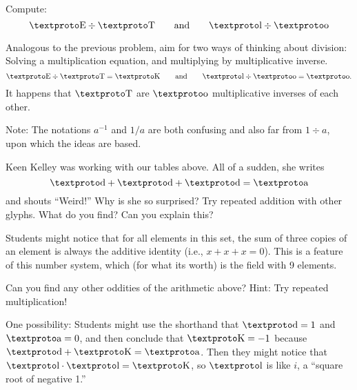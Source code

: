 \begin{prob} Compute:
\[
\lf \div \lc \qquad\text{and}\qquad \lh \div \li
\]
\begin{teachingnote}
Analogous to the previous problem, aim for two ways of thinking about division:  Solving a multiplication equation, and multiplying by multiplicative inverse. 
\[
\lf \div \lc = \ld \qquad\text{and}\qquad \lh \div \li = \li. \\
\]
It happens that $\lc$ are $\li$ multiplicative inverses of each other.  

Note:  The notations $a^{-1}$ and $1/a$ are both confusing and also far from $1\div a$, upon which the ideas are based.  
\end{teachingnote}
\end{prob}

\begin{prob} 
Keen Kelley was working with our tables above. All of a sudden, she
writes
\[
\loo + \loo + \loo = \lo
\]
and shouts ``Weird!'' Why is she so surprised? Try repeated addition
with other glyphs. What do you find? Can you explain this?
\begin{teachingnote}
Students might notice that for all elements in this set, the sum of three copies of an element is always the additive identity (i.e., $x + x + x = 0$).  This is a feature of this number system, which (for what its worth) is the field with 9 elements.  
\end{teachingnote}
\end{prob}


\begin{prob}
Can you find any other oddities of the arithmetic above? Hint: Try
repeated multiplication!
\begin{teachingnote}
One possibility: Students might use the shorthand that $\loo = 1$ and $\lo = 0$, and then conclude that $\ld = -1$ because $\loo+\ld=\lo$.  Then they might notice that $\lh\cdot \lh = \ld$, so $\lh$ is like $i$, a ``square root of negative 1.''
\end{teachingnote}
\end{prob}


